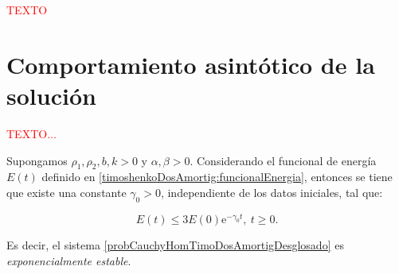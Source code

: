 \textcolor{red}{TEXTO}

\section{Comportamiento asintótico de la solución}
\label{ch:TimoshenkoFric:section:compAsintotico}

\textcolor{red}{TEXTO...}

\begin{Teorema}
\label{ch:TimoshenkoFric:th:compExponencial}

    Supongamos $\rho_1, \rho_2, b, k > 0$ y $\alpha, \beta > 0$. Considerando el funcional de energía $E(t)$ definido en \eqref{timoshenkoDosAmortig:funcionalEnergia}, entonces se tiene que existe una constante $\gamma_0 > 0$, independiente de los datos iniciales, tal que:

    \[E(t) \leq 3E(0)\mathrm{e}^{-\gamma_0t}, \ t \geq 0.\]

    Es decir, el sistema \eqref{probCauchyHomTimoDosAmortigDesglosado} es \textit{exponencialmente estable}.
\end{Teorema}

